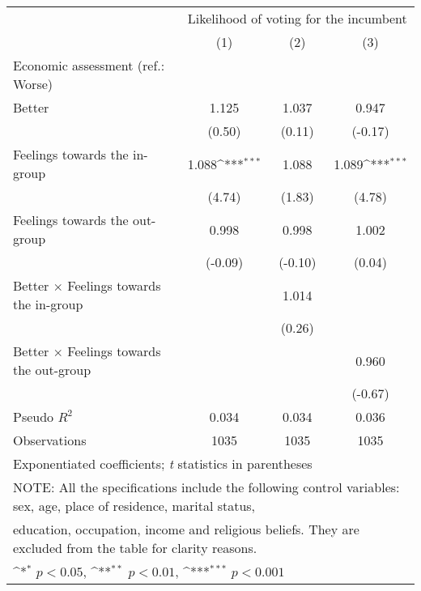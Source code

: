 {
\def\sym#1{\ifmmode^{#1}\else\(^{#1}\)\fi}
\begin{tabular}{l*{3}{c}}
\toprule
                &\multicolumn{3}{c}{Likelihood of voting for the incumbent}\\\cmidrule(lr){2-4}
                &\multicolumn{1}{c}{(1)}         &\multicolumn{1}{c}{(2)}         &\multicolumn{1}{c}{(3)}         \\
\midrule
Economic assessment (ref.: Worse)&                  &                  &                  \\
Better          &    1.125         &    1.037         &    0.947         \\
                &   (0.50)         &   (0.11)         &  (-0.17)         \\
Feelings towards the in-group&    1.088\sym{***}&    1.088         &    1.089\sym{***}\\
                &   (4.74)         &   (1.83)         &   (4.78)         \\
Feelings towards the out-group&    0.998         &    0.998         &    1.002         \\
                &  (-0.09)         &  (-0.10)         &   (0.04)         \\
Better $\times$ Feelings towards the in-group&                  &    1.014         &                  \\
                &                  &   (0.26)         &                  \\
Better $\times$ Feelings towards the out-group&                  &                  &    0.960         \\
                &                  &                  &  (-0.67)         \\
\midrule
Pseudo \(R^{2}\)&    0.034         &    0.034         &    0.036         \\
Observations    &     1035         &     1035         &     1035         \\
\bottomrule
\multicolumn{4}{l}{\footnotesize Exponentiated coefficients; \textit{t} statistics in parentheses}\\
\multicolumn{4}{l}{\footnotesize NOTE: All the specifications include the following control variables: sex, age, place of residence, marital status,}\\
\multicolumn{4}{l}{\footnotesize education, occupation, income and religious beliefs. They are excluded from the table for clarity reasons.}\\
\multicolumn{4}{l}{\footnotesize \sym{*} \(p<0.05\), \sym{**} \(p<0.01\), \sym{***} \(p<0.001\)}\\
\end{tabular}
}
